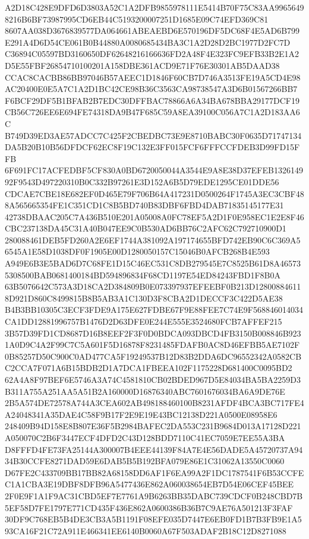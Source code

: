 \documentclass[UTF8,fontset=fandol,zihao=-4,a4paper]{ctexart}
\begin{document}
{{A2D18C428E9DFD6D3803A52C1A2DFB9855978111E5414B70F75C83AA99656498216B6BF73987995CD6EB44C5193200007251D1685E09C74EFD369C81
8607AA038D3676839577DA064661ABEAEBD6E570196DF5DC68F4E5AD6B799E291A4D6D54CE061B0B44880A0080685434BA3C1A2D28D2BC1977D2FC7D
C36894C05597BD3160650DF62648216166636FD2A48F4E323FC9EFB33B2E1A2D5E55FBF26854710100201A158DBE361ACD9E71F76E30301AB5DAAD38
CCAC8CACBB86BB97046B57AEEC1D1846F60CB7D746A3513FE19A5CD4E98AC20400E0E5A7C1A2D1BC42CE98B36C3563CA98738547A3D6B01567266BB7
F6BCF29DF5B1BFAB2B7EDC30DFFBAC78866A6A34BA678BBA29177DCF19CB56C726EE6E694FE74318DA9B47F685C59A8EA39100C056A7C1A2D183AA6C
B749D39ED3AE57ADCC7C425F2CBEDBC73E9E8710BABC30F0635D71747134DA5B20B10B56DFDCF62EC8F19C132E3FF015FCF6FFFCCFDEB3D99FD15FFB
6F691FC17ACFEDBF5CF830A0BD6720050044A3544E9A8E38D37EFEB132614992F9543D497220310B0C332B97261E3D152A6B5D79EDE1295CE01DDE56
CDCAE7CBE18E682EF0D465E79F706B64A417231D0500264F1745A3EC3CBF488A565665354FE1C351CD1C8B5BD740B83DBF6FBD4DAB71835145177E31
42738DBAAC205C7A436B510E201A05008A0FC78EF5A2D1F0E958EC1E2E8F46CBC237138DA45C31A40B047EE9C0B530AD6BB76C2AFC62C792710900D1
280088461DEB5FD260A2E6EF1744A381092A197174655BFD742EB90C6C369A56545A1E58D1038DF0F1905E00D1280050157C15046B0AFCB268B4E593
A949E6B3E5BAD6D7C68FE1D15C46EC531C8DB279545E7C8525B61D8A465735308500BAB0681400184BD594896834F68CD1197E54ED84243FBD1F8B0A
63B5076642C573A3D18CA2D384809B0E073397937EFEEBF0B213D128008846118D921D860C8499815B8B5AB3A1C130D3F8CBA2D1DECCF3C422D5AE38
B4B3BB10305C3ECF3FDE9A175E627FDBE67F9E88FEE7C74E9F568846014034CA1DD12881996757B1476D2D63DFE0E244E555E3524680FCB7AFFEF215
3B57D39FD1CD8687D16B8EEF2F3F0D0BDCA093DBCD4FB3150B008846B9231A0D9C4A2F99C7C5A601F5D16878F8231485FDAFB0AC8D46EFBB5AE7102F
0B85257D50C900C0AD477CA5F19249537B12D83B2DDA6DC96552342A0582CBC2CCA7F071A6B15BDB2D1A7DCA1FBEEA102F1175228D681400C0095BD2
62A4A8F97BEF6E5746A3A74C4581810CB02BDED967D5E84034BA5BA2259D3B311A755A251AA5A51B2A160000D16876340ABC7601676034BA6A9DE76E
2B5A574DE72578A744A3CEA602AB498188460100B8231AFDF4BCA3BC717FE4A24048341A35DAE4C58F9B17F2E9E19E43BC12138D221A0500E08958E6
248409B94D158E8B807E36F5B2984BAFEC2DA553C231B9684D013A17128D221A050070C2B6F3447ECF4DFD2C43D128BDD7110C41EC7059E7EE55A3BA
D8FFFD4FE73FA25144A300007B4EEE44139F84A7E4E56DADE5A45720737A9434B30CCFE8271DAD59E6DAB5B5B192BFA079E86E1C31062A13550C0060
D67FE2C433709BB17BB82A68158DD6AF1F6EA99A2F1DC1787541F6B53CCFEC1A1CBA3E19DBF8DFB96A5477436E862A060038654EB7D54E06CEF45BEE
2F0E9F1A1F9AC31CBD5EF7E7761A9B6263BB35DABC739CDCF0B248CBD7B5EF58D7FE1797E771CD435F436E862A0600386B36B7C9AE76A501213F3FAF
30DF9C768EB5B4DE3CB3A5B1191F08EFE035D7447E6EB0FD1B7B3FB9E1A593CA16F21C72A911E466341EE6140B0060A67F503ADAF2B18C12D8271088
}}
\end{document}
